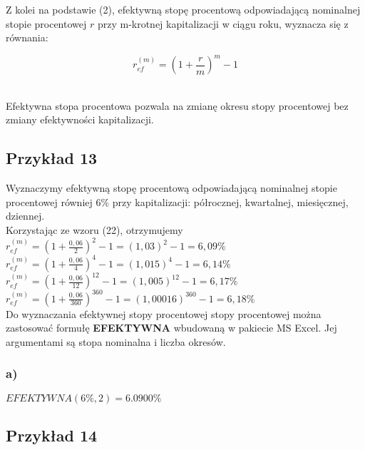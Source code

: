 \documentclass{article}
\begin{document}
Z kolei na podstawie (2), efektywną stopę procentową odpowiadającą nominalnej stopie procentowej $ r $ przy m-krotnej kapitalizacji w ciągu roku, wyznacza się z równania:

\begin{center}
	\begin{equation}
		r^{(m)}_{ef} = (1 + \frac{r}{m})^m - 1
	\end{equation}
\end{center}\\

Efektywna stopa procentowa pozwala na zmianę okresu stopy procentowej bez zmiany efektywności kapitalizacji.\\

\subsection{Przykład 13}

Wyznaczymy efektywną stopę procentową odpowiadającą nominalnej stopie procentowej równiej $ 6 \% $ przy kapitalizacji: półrocznej, kwartalnej, miesięcznej, dziennej.\\

Korzystając ze wzoru (22), otrzymujemy\\

$ r^{(m)}_{ef} = (1 + \frac{0,06}{2})^2 - 1 = (1,03)^2 - 1 = 6,09 \% $\\

$ r^{(m)}_{ef} = (1 + \frac{0,06}{4})^4 - 1 = (1,015)^4 - 1 = 6,14 \% $\\

$ r^{(m)}_{ef} = (1 + \frac{0,06}{12})^12 - 1 = (1,005)^12 - 1 = 6,17 \% $\\

$ r^{(m)}_{ef} = (1 + \frac{0,06}{360})^360 - 1 = (1,00016)^360 - 1 = 6,18 \% $\\

Do wyznaczania efektywnej stopy procentowej stopy procentowej można zastosować formułę \textbf{EFEKTYWNA} wbudowaną w pakiecie MS Excel. Jej argumentami są stopa nominalna i liczba okresów.

\subsubsection{a)}

$ EFEKTYWNA(6 \%, 2) = 6.0900 \% $\\

\subsection{Przykład 14}
\end{document}
